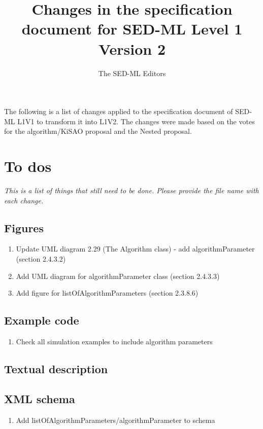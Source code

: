 \documentclass{article}
\begin{document}
\title{Changes in the specification document for SED-ML Level 1 Version 2}
\author{The SED-ML Editors}

\maketitle

The following is a list of changes applied to the specification document of SED-ML L1V1 to transform it into L1V2. The changes were made based on the votes for the algorithm/KiSAO proposal and the Nested proposal.

\section{To dos}
\emph{This is a list of things that still need to be done. Please provide the file name with each change.}

\begin{enumerate}
\end{enumerate}

\subsection{Figures}
\begin{enumerate}
\item Update UML diagram 2.29 (The Algorithm class) - add algorithmParameter (section 2.4.3.2)
\item Add UML diagram for algorithmParameter class (section 2.4.3.3) 
\item Add figure for listOfAlgorithmParameters (section 2.3.8.6)
\end{enumerate}

\subsection{Example code}
\begin{enumerate}
\item Check all simulation examples to include algorithm parameters
\end{enumerate}
\subsection{Textual description}

\subsection{XML schema}
\begin{enumerate}
\item Add listOfAlgorithmParameters/algorithmParameter to schema
\end{enumerate}
\end{document}
